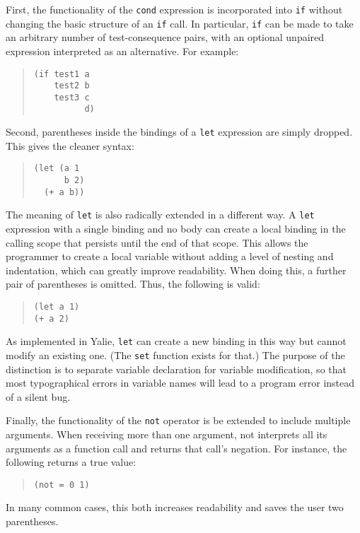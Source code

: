 \documentclass[twocolumn]{article}
\begin{document}
First, the functionality of the \texttt{cond} expression is
incorporated into \texttt{if} without changing the basic structure of
an \texttt{if} call. In particular, \texttt{if} can be made to take an
arbitrary number of test-consequence pairs, with an optional unpaired
expression interpreted as an alternative. For example:
\begin{quote}
\begin{verbatim}
(if test1 a
    test2 b
    test3 c
          d)
\end{verbatim}
\end{quote}

Second, parentheses inside the bindings of a \texttt{let} expression
are simply dropped. This gives the cleaner syntax:
\begin{quote}
\begin{verbatim}
(let (a 1
      b 2)
  (+ a b))
\end{verbatim}
\end{quote}
The meaning of \texttt{let} is also radically extended in a different
way. A \texttt{let} expression with a single binding and no body can
create a local binding in the calling scope that persists until the
end of that scope. This allows the programmer to create a local
variable without adding a level of nesting and indentation, which can
greatly improve readability. When doing this, a further pair of
parentheses is omitted. Thus, the following is valid:
\begin{quote}
\begin{verbatim}
(let a 1)
(+ a 2)
\end{verbatim}
\end{quote}
As implemented in Yalie, \texttt{let} can create a new binding in this
way but cannot modify an existing one. (The \texttt{set} function
exists for that.) The purpose of the distinction is to separate
variable declaration for variable modification, so that most
typographical errors in variable names will lead to a program error
instead of a silent bug.

Finally, the functionality of the \texttt{not} operator is be extended
to include multiple arguments. When receiving more than one argument,
not interprets all its arguments as a function call and returns that
call's negation. For instance, the following returns a true value:
\begin{quote}
\begin{verbatim}
(not = 0 1)
\end{verbatim}
\end{quote}
In many common cases, this both increases readability and saves the
user two parentheses.
\end{document}

